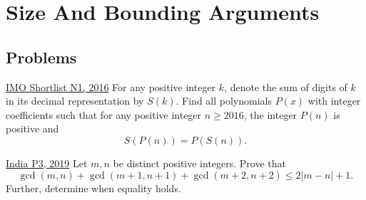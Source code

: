 \section{Size And Bounding Arguments}
\subsection{Problems}
\begin{problem}{1}{\href{https://artofproblemsolving.com/community/c6h1480723p34885693}{IMO Shortlist N1, 2016}}	
	For any positive integer $k$, denote the sum of digits of $k$ in its decimal representation by $S(k)$. Find all polynomials $P(x)$ with integer coefficients such that for any positive integer $n \geq 2016$, the integer $P(n)$ is positive and$$S(P(n)) = P(S(n)).$$
\end{problem}

\begin{problem}{2}{\href{https://artofproblemsolving.com/community/c6h1770752p34739465}{India P3, 2019}} 
	Let $m,n$ be distinct positive integers. Prove that
	$$\gcd(m,n) + \gcd(m+1,n+1) + \gcd(m+2,n+2) \le 2|m-n| + 1. $$Further, determine when equality holds.
\end{problem}

\newpage
